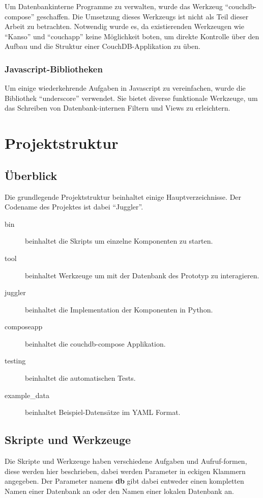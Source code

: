 Um Datenbankinterne Programme zu verwalten,
wurde das Werkzeug ``couchdb-compose'' \cite{couchdb:compose} geschaffen.
Die Umsetzung dieses Werkzeugs ist nicht als Teil dieser Arbeit zu betrachten.
Notwendig wurde es, da existierenden Werkzeugen wie ``Kanso'' und ``couchapp''
keine Möglichkeit boten, um direkte Kontrolle über den Aufbau und die Struktur 
einer CouchDB-Applikation zu üben.

\subsubsection{Javascript-Bibliotheken}

Um einige wiederkehrende Aufgaben in Javascript zu vereinfachen,
wurde die Bibliothek ``underscore'' \cite{javascript:underscore} verwendet.
Sie bietet diverse funktionale Werkzeuge, um das Schreiben
von Datenbank-internen Filtern und Views zu erleichtern.


\section{Projektstruktur}
\subsection{Überblick}

Die grundlegende Projektstruktur beinhaltet einige Hauptverzeichnisse.
Der Codename des Projektes ist dabei ``Juggler''.


\begin{description}
    \item[bin] beinhaltet die Skripts um einzelne Komponenten zu starten.
    \item[tool] beinhaltet Werkzeuge um mit der Datenbank des Prototyp zu interagieren.
    \item[juggler] beinhaltet die Implementation der Komponenten in Python.
    \item[composeapp] beinhaltet die couchdb-compose Applikation.
    \item[testing] beinhaltet die automatischen Tests.
    \item[example\_data] beinhaltet Beispiel-Datensätze im \ac{YAML} Format.
\end{description}

\subsection{Skripte und Werkzeuge}
Die Skripte und Werkzeuge haben verschiedene Aufgaben und Aufruf-formen,
diese werden hier beschrieben, dabei werden Parameter in eckigen Klammern angegeben.
Der Parameter namens \textbf{db} gibt dabei entweder einen kompletten Namen einer  Datenbank an oder den Namen einer lokalen Datenbank an.

